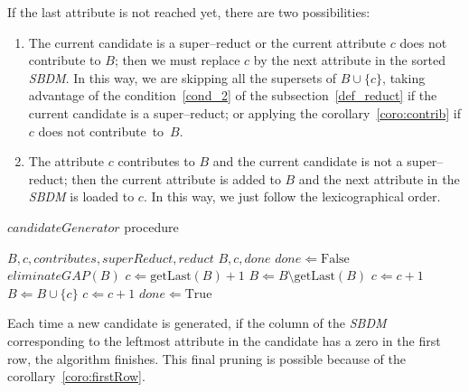 \documentclass[number,preprint,review,12pt]{elsarticle}
\begin{document}
	If the last attribute is not reached yet, there are two possibilities:			
	\begin{enumerate}
		\item The current candidate is a super--reduct or the current attribute $c$ does not contribute to $B$; then we must replace $c$ by the next attribute in the sorted \textit{SBDM}. In this way, we are skipping all the supersets of $B\cup\lbrace c\rbrace$, taking advantage of the condition~\ref{cond_2} of the subsection~\ref{def_reduct} if the current candidate is a super--reduct; or applying the corollary~\ref{coro:contrib} if $c$ does not contribute~to~$B$.
		\item The attribute $c$ contributes to $B$ and the current candidate is not a super--reduct; then the current attribute is added to $B$ and the next attribute in the \textit{SBDM} is loaded to $c$. In this way, we just follow the lexicographical order.
	\end{enumerate}  	
			
	\begin{algorithm}
		\footnotesize
		\caption{$candidateGenerator$ procedure}
		\label{alg:CandGenerator}
		\begin{algorithmic}[1]
			\Require \textit{$B,c,contributes,superReduct,reduct$}
			\Ensure $B,c,done$ 
			\State $done \Leftarrow \mathrm{False}$
			\label{line:cg} 
			\label{line:gap} 
			\State $eliminateGAP(B)$
			\EndIf
			\State $c \Leftarrow  \mathrm{getLast}(B)+1$
			\State $B \Leftarrow B\setminus \mathrm{getLast}(B)$\label{line:remLast}
			\Else
			\label{line:NCorSR}
			\State $c \Leftarrow c+1$\label{line:replaceC} 
			\Else
			\State $B \Leftarrow B\cup \lbrace c\rbrace$\label{line:add1} 
			\State $c \Leftarrow c+1$\label{line:add1End} 
			\EndIf
			\EndIf
			 \label{line:done}
			\State $done \Leftarrow \mathrm{True}$
			\EndIf
		\end{algorithmic}
	\end{algorithm}
	
	Each time a new candidate is generated, if the column of the \textit{SBDM} corresponding to the leftmost attribute in the candidate has a zero in the first row, the algorithm finishes. This final pruning is possible because of the corollary~\ref{coro:firstRow}.
	
\end{document}
